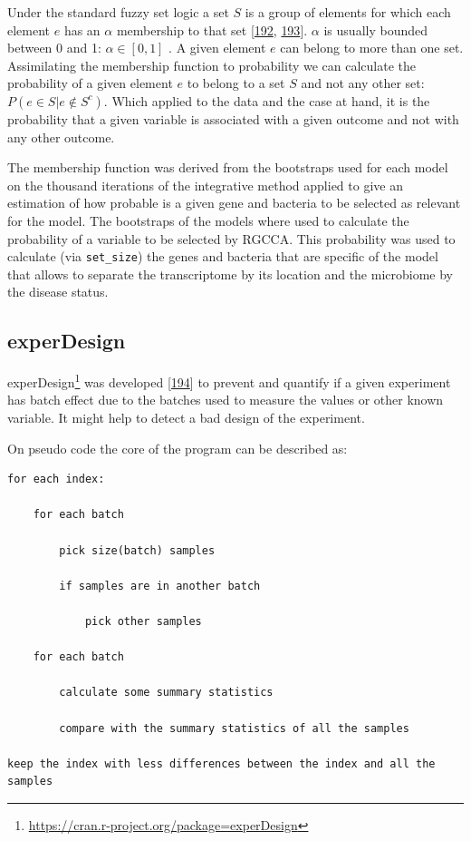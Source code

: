 \documentclass[
  12pt,
  a4paper,
  twoside,
  openright]{book}
\DeclareRobustCommand{\href}[2]{#2\footnote{\url{#1}}}
\begin{document}
Under the standard fuzzy set logic a set \(S\) is a group of elements for which each element \(e\) has an \(\alpha\) membership to that set {[}\protect\hyperlink{ref-filzmoser2004}{192}, \protect\hyperlink{ref-dubois1993}{193}{]}.
\(\alpha\) is usually bounded between 0 and 1: \(\alpha \in [0, 1]\) .
A given element \(e\) can belong to more than one set.
Assimilating the membership function to probability we can calculate the probability of a given element \(e\) to belong to a set \(S\) and not any other set: \(P(e \in S|e \not \in S^c)\).
Which applied to the data and the case at hand, it is the probability that a given variable is associated with a given outcome and not with any other outcome.

The membership function was derived from the bootstraps used for each model on the thousand iterations of the integrative method applied to give an estimation of how probable is a given gene and bacteria to be selected as relevant for the model.
The bootstraps of the models where used to calculate the probability of a variable to be selected by RGCCA.
This probability was used to calculate (via \texttt{set\_size}) the genes and bacteria that are specific of the model that allows to separate the transcriptome by its location and the microbiome by the disease status.

\hypertarget{experdesign}{%
\subsection{experDesign}\label{experdesign}}

\href{https://cran.r-project.org/package=experDesign}{experDesign} was developed {[}\protect\hyperlink{ref-revillasancho2021}{194}{]} to prevent and quantify if a given experiment has batch effect due to the batches used to measure the values or other known variable.
It might help to detect a bad design of the experiment.

On pseudo code the core of the program can be described as:

\hypertarget{pseudocode-experDesign}{%
\label{pseudocode-experDesign}}%
\begin{verbatim}
for each index:

    for each batch

        pick size(batch) samples

        if samples are in another batch

            pick other samples

    for each batch

        calculate some summary statistics

        compare with the summary statistics of all the samples

keep the index with less differences between the index and all the samples
\end{verbatim}
\end{document}
